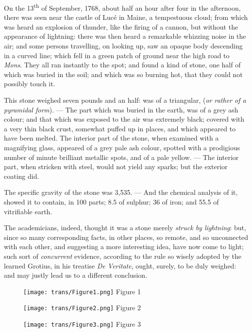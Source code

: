 \documentclass[a4paper, 12pt, oneside, twocolumn]{article}
\begin{document}
On the 13\textsuperscript{th} of September, 1768, about half an hour after four in the afternoon, there was seen near the castle of Lucé in Maine, a tempestuous cloud; from which was heard an explosion of thunder, like the firing of a cannon, but without the appearance of lightning: there was then heard a remarkable whizzing noise in the air; and some persons travelling, on looking up, saw an opaque body descending in a curved line; which fell in a green patch of ground near the high road to \emph{Mons}. They all ran instantly to the spot; and found a kind of stone, one half of which was buried in the soil; and which was so burning hot, that they could not possibly touch it.

This stone weighed seven pounds and an half: was of a triangular, (\emph{or rather of a pyramidal form}). --- The part which was buried in the earth, was of a grey ash colour; and that which was exposed to the air was extremely black; covered with a very thin black crust, somewhat puffed up in places, and which appeared to have been melted. The interior part of the stone, when examined with a magnifying glass, appeared of a grey pale ash colour, spotted with a prodigious number of minute brilliant metallic spots, and of a pale yellow. --- The interior part, when stricken with steel, would not yield any sparks; but the exterior coating did.

The specific gravity of the stone was 3,535. --- And the chemical analysis of it, showed it to contain, in 100 parts; 8.5 of sulphur; 36 of iron; and 55.5 of vitrifiable earth.

The academicians, indeed, thought it was a stone merely \emph{struck by lightning}: but, since so many corresponding facts, in other places, so remote, and so unconnected with each other, and suggesting a more interesting idea, have now come to light; such sort of \emph{concurrent} evidence, according to the rule so wisely adopted by the learned Grotius, in his treatise \emph{De Veritate}, ought, surely, to be duly weighed: and may justly lead us to a different conclusion.
\clearpage
\pagestyle{fancy}
\fancyhf{}
\rfoot{\Fontauri{\thepage}}
\begin{figure}[b]
\centering
\texttt{[image: trans/Figure1.png]}
\Fontauri
Figure 1
\end{figure}
\begin{figure}[b]
\centering
\texttt{[image: trans/Figure2.png]}
\Fontauri
Figure 2
\end{figure}
\begin{figure}[b]
\centering
\texttt{[image: trans/Figure3.png]}
\Fontauri
Figure 3
\end{figure}

\clearpage
\end{document}
